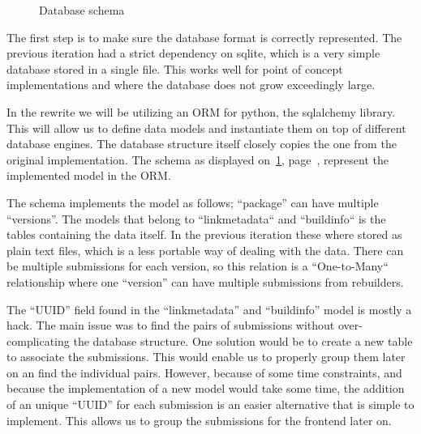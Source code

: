 \documentclass[../Main/thesis.tex]{subfiles}
\begin{document}
\begin{figure}[H]
\caption{Database schema}
\label{fig:schema}
\end{figure}

The first step is to make sure the database format is correctly represented. The
previous iteration had a strict dependency on sqlite, which is a very simple
database stored in a single file. This works well for point of concept
implementations and where the database does not grow exceedingly large.

In the rewrite we will be utilizing an ORM for python, the sqlalchemy library.
This will allow us to define data models and instantiate them on top of
different database engines. The database structure itself closely copies the one
from the original implementation. The schema as displayed on~\ref{fig:schema},
page~\pageref{fig:schema}, represent the implemented model in the ORM.

The schema implements the model as follows; ``package'' can have multiple
``versions''. The models that belong to ``linkmetadata`` and ``buildinfo`` is
the tables containing the data itself. In the previous iteration these where
stored as plain text files, which is a less portable way of dealing with the
data. There can be multiple submissions for each version, so this relation is a
``One-to-Many`` relationship where one ``version'' can have multiple submissions
from rebuilders.

The ``UUID'' field found in the ``linkmetadata'' and ``buildinfo'' model is
mostly a hack. The main issue was to find the pairs of submissions without
over-complicating the database structure. One solution would be to create a new
table to associate the submissions. This would enable us to properly group them
later on an find the individual pairs. However, because of some time
constraints, and because the implementation of a new model would take some time,
the addition of an unique ``UUID'' for each submission is an easier alternative
that is simple to implement. This allows us to group the submissions for the
frontend later on.
\end{document}
